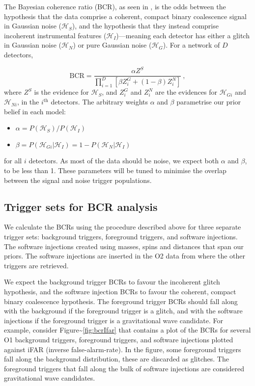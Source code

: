 \documentclass[%
 reprint,
 amsmath,amssymb,
 aps,
]{revtex4}
\begin{document}
The Bayesian coherence ratio (BCR), as seen in \citet{bcr_paper}, is the odds between the hypothesis that the data comprise a
coherent, compact binary coalescence signal in Gaussian noise (\(\mathcal{H}_S\)), and the hypothesis that they instead
comprise incoherent instrumental features (\(\mathcal{H}_I\))---meaning each detector has either a glitch in Gaussian noise
(\(\mathcal{H}_N\)) or pure Gaussian noise (\(\mathcal{H}_G\)). For a network of \(D\) detectors,

\begin{equation}
\mathrm{BCR} = \frac{\alpha Z^{S}}{\prod_{i=1}^{D}\left[\beta Z_{i}^{G}+(1-\beta) Z_{i}^{N}\right]}\ , \label{eq:bcr}
\end{equation}
where \(Z^S\) is the evidence for \(\mathcal{H}_S\), and \(Z^{G}_i\) and
\(Z^N_i\) are the evidences for \(\mathcal{H}_{Gi}\) and \(\mathcal{H}_{Ni}\),
in the \(i^{\text{th}}\) detectors. The arbitrary weights \(\alpha\) and \(\beta\)
parametrise our prior belief in each model:

\begin{itemize}
\item
  \(\alpha = P(\mathcal{H}_S)/P(\mathcal{H}_I)\)
\item
  \(\beta = P(\mathcal{H}_{Gi}|\mathcal{H}_I)=1-P(\mathcal{H}_{N}|\mathcal{H}_I)\)
\end{itemize}

for all \(i\) detectors. As most of the data should be noise, we expect both \(\alpha\) and \(\beta\), to be less than 1.
These parameters will be tuned to minimise the overlap between the signal and noise trigger populations.

\hypertarget{trigger-sets-for-bcr-analysis}{%
\subsection{Trigger sets for BCR analysis}\label{trigger-sets-for-bcr-analysis}}

We calculate the BCRs using the procedure described above for three separate trigger sets: background triggers,
foreground triggers, and software injections. The software injections created using masses, spins and distances that
span our priors. The software injections are inserted in the O2 data from where the other triggers are retrieved.

We expect the background trigger BCRs to favour the incoherent glitch hypothesis, and the software injection BCRs to
favour the coherent, compact binary coalescence hypothesis. The foreground trigger BCRs should fall along with the
background if the foreground trigger is a glitch, and with the software injections if the foreground trigger is a
gravitational wave candidate. For example, consider Figure\textasciitilde\ref{fig:bcrIfar} that contains a plot of the BCRs for
several O1 background triggers, foreground triggers, and software injections plotted against iFAR (inverse
false-alarm-rate). In the figure, some foreground triggers fall along the background distribution, these are discarded
as glitches. The foreground triggers that fall along the bulk of software injections are considered gravitational wave
candidates.
\end{document}
